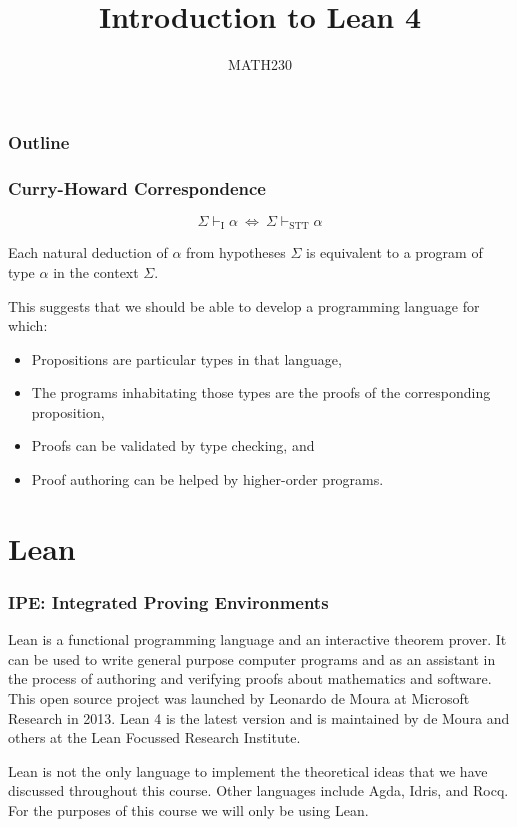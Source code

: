 \documentclass{beamer}
\title{Introduction to Lean 4}
\author{MATH230}
\institute{School of Mathematics and Statistics \\ University of Canterbury}
\date{}
\theoremstyle{indentDefn} \newtheorem{defn}[]{Definition}
\begin{document}
\begin{frame}

  \titlepage

\end{frame}

\begin{frame}
  \frametitle{Outline}

  \tableofcontents

\end{frame}

\begin{frame}
\frametitle{Curry-Howard Correspondence}

$$\Sigma \vdash_{\text{I}} \alpha \ \iff \ \Sigma \vdash_{\text{STT}} \alpha$$

Each natural deduction of $\alpha$ from hypotheses $\Sigma$ is equivalent to a program of type $\alpha$ in the context $\Sigma$.

This suggests that we should be able to develop a programming language for which:

\begin{itemize}
	\item Propositions are particular types in that language,
	\item The programs inhabitating those types are the proofs of the corresponding proposition,
	\item Proofs can be validated by type checking, and
	\item Proof authoring can be helped by higher-order programs.
\end{itemize}
\end{frame}

\section{Lean}

\begin{frame}
\frametitle{IPE: Integrated Proving Environments}
Lean is a functional programming language and an interactive theorem prover. It can be used to write general purpose computer programs and as an assistant in the process of authoring and verifying proofs about mathematics and software. This open source project was launched by Leonardo de Moura at Microsoft Research in 2013. Lean 4 is the latest version and is maintained by de Moura and others at the Lean Focussed Research Institute.

Lean is not the only language to implement the theoretical ideas that we have discussed throughout this course. Other languages include Agda, Idris, and Rocq. For the purposes of this course we will only be using Lean. 


\end{frame}
\end{document}
